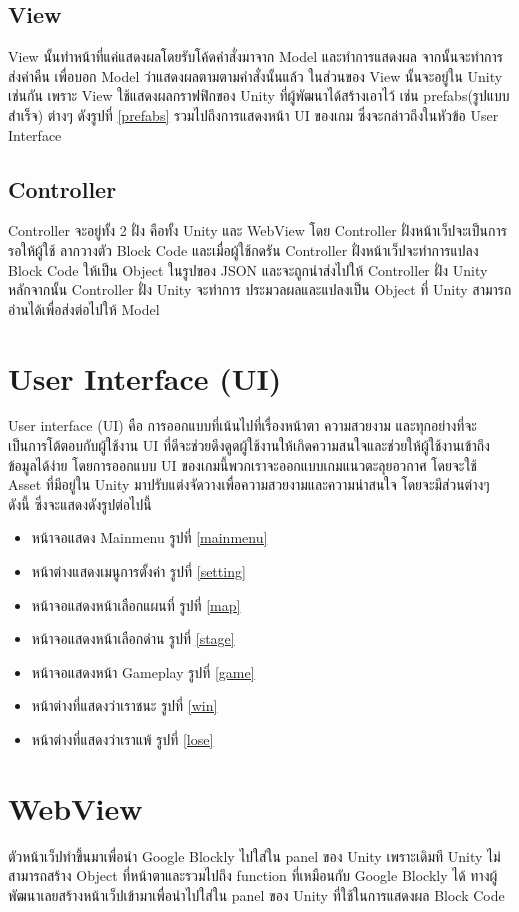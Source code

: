 \subsection{View}
View นั้นทำหน้าที่แค่แสดงผลโดยรับโค้ดคำสั่งมาจาก Model และทำการแสดงผล จากนั้นจะทำการ
ส่งค่าคืน เพื่อบอก Model ว่าแสดงผลตามตามคำสั่งนั้นแล้ว ในส่วนของ View นั้นจะอยู่ใน
Unity เช่นกัน เพราะ View ใช้แสดงผลกราฟฟิกของ Unity ที่ผู้พัฒนาได้สร้างเอาไว้ เช่น prefabs(รูปแบบสำเร็จ) ต่างๆ ดังรูปที่ \ref{prefabs}
รวมไปถึงการแสดงหน้า UI ของเกม ซึ่งจะกล่าวถึงในหัวข้อ User Interface\par
    

\subsection{Controller}
Controller จะอยู่ทั้ง 2 ฝั่ง คือทั้ง Unity และ WebView โดย Controller ฝั่งหน้าเว็ปจะเป็นการรอให้ผู้ใช้
ลากวางตัว Block Code และเมื่อผู้ใช้กดรัน Controller ฝั่งหน้าเว็ปจะทำการแปลง Block Code ให้เป็น Object 
ในรูปของ JSON และจะถูกนำส่งไปให้ Controller ฝั่ง Unity หลักจากนั้น Controller ฝั่ง Unity จะทำการ
ประมวลผลและแปลงเป็น Object ที่ Unity สามารถอ่านได้เพื่อส่งต่อไปให้ Model

\section{User Interface (UI)}
User interface (UI) คือ การออกแบบที่เน้นไปที่เรื่องหน้าตา ความสวยงาม และทุกอย่างที่จะเป็นการโต้ตอบกับผู้ใช้งาน UI ที่ดีจะช่วยดึงดูดผู้ใช้งานให้เกิดความสนใจและช่วยให้ผู้ใช้งานเข้าถึงข้อมูลได้ง่าย
โดยการออกแบบ UI ของเกมนี้พวกเราจะออกแบบเกมแนวตะลุยอวกาศ โดยจะใช้ Asset ที่มีอยู่ใน Unity มาปรับแต่งจัดวางเพื่อความสวยงามและความน่าสนใจ โดยจะมีส่วนต่างๆ ดังนี้ ซึ่งจะแสดงดังรูปต่อไปนี้
\begin{itemize}
\item หน้าจอแสดง Mainmenu รูปที่ \ref{mainmenu}
\item หน้าต่างแสดงเมนูการตั้งค่า รูปที่ \ref{setting}
\item หน้าจอแสดงหน้าเลือกแผนที่ รูปที่ \ref{map}
\item หน้าจอแสดงหน้าเลือกด่าน รูปที่ \ref{stage}
\item หน้าจอแสดงหน้า Gameplay รูปที่ \ref{game}
\item หน้าต่างที่แสดงว่าเราชนะ รูปที่ \ref{win}
\item หน้าต่างที่แสดงว่าเราแพ้ รูปที่ \ref{lose}
\end{itemize}

\section{WebView}
ตัวหน้าเว็ปทำขึ้นมาเพื่อนำ Google Blockly ไปใส่ใน panel ของ Unity เพราะเดิมที Unity ไม่สามารถสร้าง Object ที่หน้าตาและรวมไปถึง function ที่เหมือนกับ Google Blockly ได้ ทางผู้พัฒนาเลยสร้างหน้าเว็ปเข้ามาเพื่อนำไปใส่ใน 
panel ของ Unity ที่ใช้ในการแสดงผล Block Code

